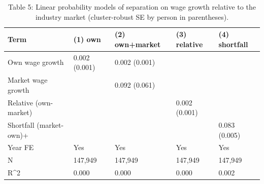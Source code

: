 \begin{table}
\caption{Table 5: Linear probability models of separation on wage growth relative to the industry market (cluster-robust SE by person in parentheses).}
\label{tab:table5_relwage}
\begin{tabular}{lllll}
\toprule
Term & (1) own & (2) own+market & (3) relative & (4) shortfall \\
\midrule
Own wage growth & 0.002 (0.001) & 0.002 (0.001) &  &  \\
Market wage growth &  & 0.092 (0.061) &  &  \\
Relative (own-market) &  &  & 0.002 (0.001) &  \\
Shortfall (market-own)+ &  &  &  & 0.083 (0.005) \\
Year FE & Yes & Yes & Yes & Yes \\
N & 147,949 & 147,949 & 147,949 & 147,949 \\
R^2 & 0.000 & 0.000 & 0.000 & 0.002 \\
\bottomrule
\end{tabular}
\end{table}
